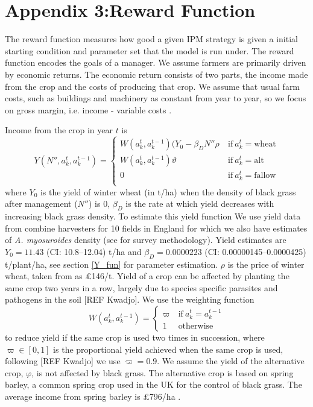 \documentclass[12pt, a4paper]{article}
\begin{document}
\section*{Appendix 3:Reward Function}
The reward function measures how good a given IPM strategy is given a initial starting condition and parameter set that the model is run under. The reward function encodes the goals of a manager. We assume farmers are primarily driven by economic returns. The economic return consists of two parts, the income made from the crop and the costs of producing that crop. We assume that usual farm costs, such as buildings and machinery as constant from year to year, so we focus on gross margin, i.e. income - variable costs \citep[pp.~3]{Nix2016}.

Income from the crop in year $t$ is    
\begin{equation}\label{eq:yield}
	Y(N'', a_k^t, a_k^{t-1}) = \begin{cases} 
		W(a_k^t, a_k^{t-1})(Y_0 - \beta_D N''\rho &~\text{if}~a_k^t = \text{wheat}\\
		W(a_k^t, a_k^{t-1})\vartheta &~\text{if}~a_k^t = \text{alt}\\
		0 &~\text{if}~a_k^t = \text{fallow}\\
	\end{cases}
\end{equation}   
where $Y_0$ is the yield of winter wheat (in t/ha) when the density of black grass after management ($N''$) is 0, $\beta_D$ is the rate at which yield decreases with increasing black grass density. To estimate this yield function We use yield data from combine harvesters for 10 fields in England for which we also have estimates of \textit{A. myosuroides} density (see \citealt{Hick2018} for survey methodology). Yield estimates are $Y_0 = 11.43$ (CI: 10.8--12.04) t/ha and $\beta_D = 0.0000223$ (CI: 0.00000145--0.0000425) t/plant/ha, see section \ref{Y_fun} for parameter estimation. $\rho$ is the price of winter wheat, taken from \citet[pp.~9]{Nix2016} as £146/t. Yield of a crop can be affected by planting the same crop two years in a row, largely due to species specific parasites and pathogens in the soil [REF Kwadjo]. We use the weighting function 
\begin{equation}
	W(a_k^t, a_k^{t-1}) = \begin{cases}
		\varpi &~\text{if}~a_k^t = a_k^{t-1}\\
		1 &~\text{otherwise}
	\end{cases}
\end{equation} 
to reduce yield if the same crop is used two times in succession, where $\varpi \in [0, 1]$ is the proportional yield achieved when the same crop is used, following [REF Kwadjo] we use $\varpi = 0.9$. We assume the yield of the alternative crop, $\varphi$, is not affected by black grass. The alternative crop is based on spring barley, a common spring crop used in the UK for the control of black grass. The average income from spring barley is \pounds 796/ha \citep[pp.~12]{Nix2016}.   
\end{document}
